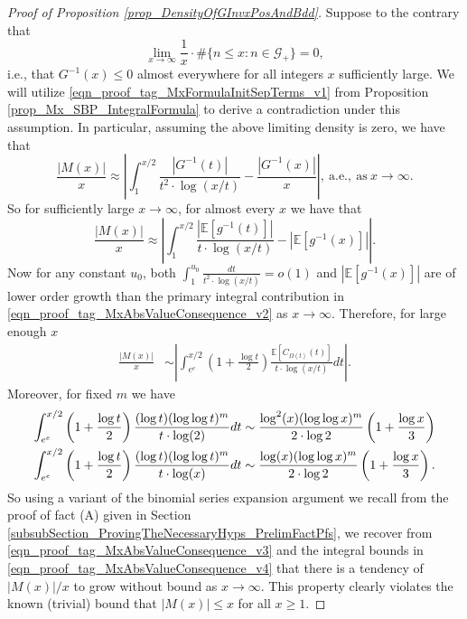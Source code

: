 \documentclass[11pt,reqno,a4letter]{article}
\numberwithin{figure}{section}
\numberwithin{table}{section}
\theoremstyle{plain}
\numberwithin{theorem}{section}
\theoremstyle{definition}
\begin{document}
\begin{proof}[Proof of Proposition \ref{prop_DensityOfGInvxPosAndBdd}] 
Suppose to the contrary that 
\[
\lim_{x \rightarrow \infty} \frac{1}{x} \cdot \#\{n \leq x: n \in \mathcal{G}_{+}\} = 0, 
\]
i.e., that $G^{-1}(x) \leq 0$ almost everywhere for all integers $x$ sufficiently large. 
We will utilize \eqref{eqn_proof_tag_MxFormulaInitSepTerms_v1} 
from Proposition \ref{prop_Mx_SBP_IntegralFormula} to 
derive a contradiction under this assumption. 
In particular, assuming the above limiting density is zero, we have that 
\begin{equation} 
\label{eqn_proof_tag_MxAbsValueConsequence_v1} 
\frac{|M(x)|}{x} \approx \left\lvert \int_1^{x/2} \frac{|G^{-1}(t)|}{t^2 \cdot \log(x/t)} - 
     \frac{|G^{-1}(x)|}{x} \right\rvert, \mathrm{\ a.e. }, \mathrm{\ as\ } x \rightarrow \infty. 
\end{equation} 
So for sufficiently large $x \rightarrow \infty$, for almost every $x$ we have that 
\begin{equation} 
\label{eqn_proof_tag_MxAbsValueConsequence_v2} 
\frac{|M(x)|}{x} \approx \left\lvert \int_1^{x/2} \frac{|\mathbb{E}[g^{-1}(t)]|}{t \cdot \log(x/t)} - 
     |\mathbb{E}[g^{-1}(x)]| \right\rvert. 
\end{equation} 
Now for any constant $u_0$, both 
$\int_{1}^{u_0} \frac{dt}{t^2 \cdot \log(x/t)} = o(1)$ and $|\mathbb{E}[g^{-1}(x)]|$ are of lower order 
growth than the primary integral contribution in 
\eqref{eqn_proof_tag_MxAbsValueConsequence_v2} as $x \rightarrow \infty$. 
Therefore, for large enough $x$ 
\begin{align} 
\label{eqn_proof_tag_MxAbsValueConsequence_v3} 
\frac{|M(x)|}{x} & \sim \left\lvert 
     \int_{e^e}^{x/2} \left(1 + \frac{\log t}{2}\right) \frac{\mathbb{E}[C_{\Omega(t)}(t)]}{t \cdot \log(x/t)} dt 
     \right\rvert. 
\end{align} 
Moreover, for fixed $m$ we have 
\begin{align} 
\label{eqn_proof_tag_MxAbsValueConsequence_v4} 
\int_{e^e}^{x/2} \left(1 + \frac{\log t}{2}\right) \frac{(\log t) (\log\log t)^m}{t \cdot \log(2)} dt & \sim
     \frac{\log^2(x) (\log\log x)^m}{2 \cdot \log 2} \left(1 + \frac{\log x}{3}\right) \\ 
\notag 
\int_{e^e}^{x/2} \left(1 + \frac{\log t}{2}\right) \frac{(\log t) (\log\log t)^m}{t \cdot \log(x)} dt & \sim
     \frac{\log(x) (\log\log x)^m}{2 \cdot \log 2} \left(1 + \frac{\log x}{3}\right). 
\end{align} 
So using a variant of the binomial series expansion argument we recall from the 
proof of fact (A) given in 
Section \ref{subsubSection_ProvingTheNecessaryHyps_PrelimFactPfs}, 
we recover from \eqref{eqn_proof_tag_MxAbsValueConsequence_v3} and the integral bounds in 
\eqref{eqn_proof_tag_MxAbsValueConsequence_v4} that 
there is a tendency of $|M(x)| / x$ to grow without bound as $x \rightarrow \infty$. 
This property clearly violates the known (trivial) bound that $|M(x)| \leq x$ for all $x \geq 1$. 


\end{proof}
\end{document}
